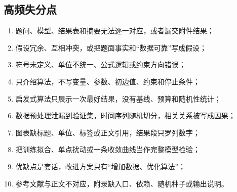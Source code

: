 \subsection{高频失分点}

\begin{enumerate}
  \item 题问、模型、结果表和摘要无法逐一对应，或者漏交附件结果；
  \item 假设冗余、互相冲突，或把题面事实和“数据可靠”写成假设；
  \item 符号未定义、单位不统一、公式逻辑或约束方向错误；
  \item 只介绍算法，不写变量、参数、初边值、约束和停止条件；
  \item 启发式算法只展示一次最好结果，没有基线、预算和随机性统计；
  \item 数据预处理泄漏到验证集，时间序列随机切分，相关关系被写成因果；
  \item 图表缺标题、单位、标签或正文引用，结果段只罗列数字；
  \item 把训练拟合、单点扰动或一条收敛曲线当作完整模型检验；
  \item 优缺点是套话，改进方案只有“增加数据、优化算法”；
  \item 参考文献与正文不对应，附录缺入口、依赖、随机种子或输出说明。
\end{enumerate}

